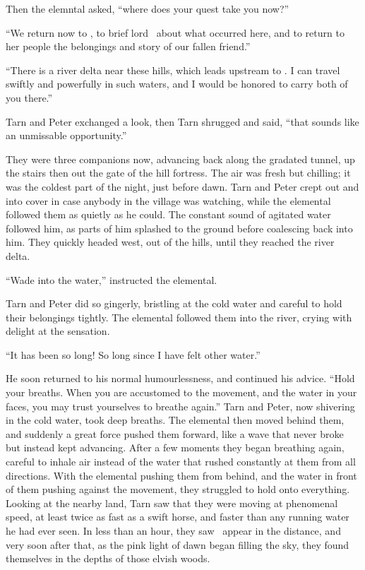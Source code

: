 Then the elemntal asked, ``where does your quest take you now?''

``We return now to \inarthonor, to brief lord \arilor\ about what occurred here, and to return to her people the belongings and story of our fallen friend.''

``There is a river delta near these hills, which leads upstream to \inarthonor.  I can travel swiftly and powerfully in such waters, and I would be honored to carry both of you there.''

Tarn and Peter exchanged a look, then Tarn shrugged and said, ``that sounds like an unmissable opportunity.''

They were three companions now, advancing back along the gradated tunnel, up the stairs then out the gate of the hill fortress.  The air was fresh but chilling; it was the coldest part of the night, just before dawn.  Tarn and Peter crept out and into cover in case anybody in the village was watching, while the elemental followed them as quietly as he could.  The constant sound of agitated water followed him, as parts of him splashed to the ground before coalescing back into him.  They quickly headed west, out of the hills, until they reached the river delta.

``Wade into the water,'' instructed the elemental.

Tarn and Peter did so gingerly, bristling at the cold water and careful to hold their belongings tightly.  The elemental followed them into the river, crying with delight at the sensation.

``It has been so long!  So long since I have felt other water.''

He soon returned to his normal humourlessness, and continued his advice.  ``Hold your breaths.  When you are accustomed to the movement, and the water in your faces, you may trust yourselves to breathe again.''  Tarn and Peter, now shivering in the cold water, took deep breaths.  The elemental then moved behind them, and suddenly a great force pushed them forward, like a wave that never broke but instead kept advancing.  After a few moments they began breathing again, careful to inhale air instead of the water that rushed constantly at them from all directions.  With the elemental pushing them from behind, and the water in front of them pushing against the movement, they struggled to hold onto everything.  Looking at the nearby land, Tarn saw that they were moving at phenomenal speed, at least twice as fast as a swift horse, and faster than any running water he had ever seen.  In less than an hour, they saw \inarthonor\ appear in the distance, and very soon after that, as the pink light of dawn began filling the sky, they found themselves in the depths of those elvish woods.

